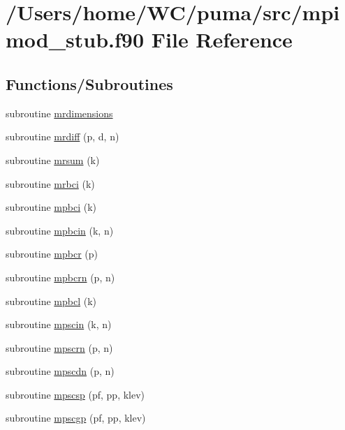 \hypertarget{mpimod__stub_8f90}{
\section{/\-Users/home/\-W\-C/puma/src/mpimod\-\_\-stub.f90 \-File \-Reference}
\label{mpimod__stub_8f90}
}
\subsection*{\-Functions/\-Subroutines}
\begin{DoxyCompactItemize}
\item 
subroutine \hyperlink{mpimod__stub_8f90_acb4a2403b5f65a70e7e5ff01ea4577f7}{mrdimensions}
\item 
subroutine \hyperlink{mpimod__stub_8f90_af3212261e3ce775f26d09859c337b760}{mrdiff} (p, d, n)
\item 
subroutine \hyperlink{mpimod__stub_8f90_a5d2bb9cfe68e5feb6de6b359f04398e3}{mrsum} (k)
\item 
subroutine \hyperlink{mpimod__stub_8f90_ab1311e17e35732047db4b93e1bb6c984}{mrbci} (k)
\item 
subroutine \hyperlink{mpimod__stub_8f90_a89982355acc98319bfc191dab28da805}{mpbci} (k)
\item 
subroutine \hyperlink{mpimod__stub_8f90_a85cfae5acde5c37604edf690e9c2f7cf}{mpbcin} (k, n)
\item 
subroutine \hyperlink{mpimod__stub_8f90_aded092db7f8071a727e2e96887702ca7}{mpbcr} (p)
\item 
subroutine \hyperlink{mpimod__stub_8f90_af2a0a009162180d4abb1daa1bad60cf2}{mpbcrn} (p, n)
\item 
subroutine \hyperlink{mpimod__stub_8f90_a40b910e38273e7f3c9dc4ed36d3e67a0}{mpbcl} (k)
\item 
subroutine \hyperlink{mpimod__stub_8f90_a8338d8609afcefbb1faa41f353c10ef9}{mpscin} (k, n)
\item 
subroutine \hyperlink{mpimod__stub_8f90_a1504cf64a1ffc198a8a1fe54ba00d775}{mpscrn} (p, n)
\item 
subroutine \hyperlink{mpimod__stub_8f90_a3d2a5d231fd9527bcbc1fde327326922}{mpscdn} (p, n)
\item 
subroutine \hyperlink{mpimod__stub_8f90_a0c5adf4e8c7e39cf5a1038a1d34ebf30}{mpscsp} (pf, pp, klev)
\item 
subroutine \hyperlink{mpimod__stub_8f90_ac66e76c6144dfeadbc03bc5817553250}{mpscgp} (pf, pp, klev)
\item 

\end{DoxyCompactItemize}
